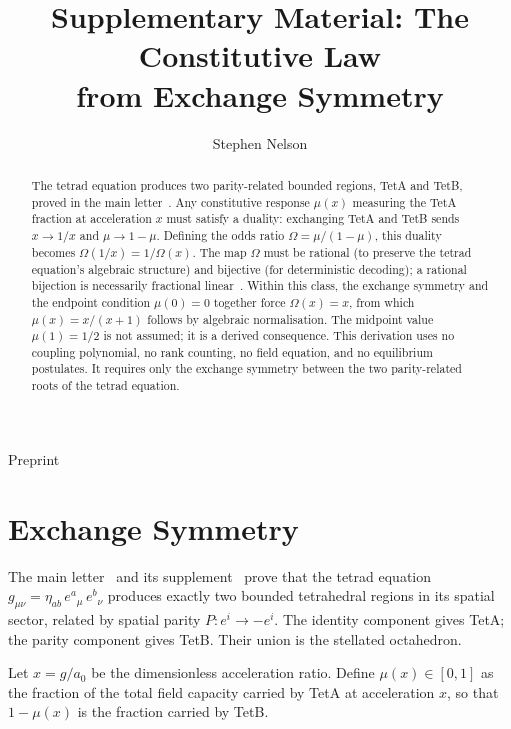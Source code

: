 \documentclass[twocolumn]{iopjournal}
\renewcommand{\articletype}[1]{%
  {\vspace*{-8mm}\noindent \Large \sf Preprint}\par
  \vspace*{6mm}\noindent{\scriptsize \sf{\bfseries \MakeUppercase{#1}}}}
\begin{document}
\articletype{Supplementary Material}

\title{Supplementary Material: The Constitutive Law\\
from Exchange Symmetry}

\author{Stephen Nelson}



\begin{abstract}
The tetrad equation produces two parity-related bounded regions,
TetA and TetB, proved in the main
letter~\cite{Nelson2026geometry}. Any constitutive response
$\mu(x)$ measuring the TetA fraction at acceleration $x$ must
satisfy a duality: exchanging TetA and TetB sends $x \to 1/x$
and $\mu \to 1 - \mu$. Defining the odds ratio
$\Omega = \mu/(1 - \mu)$, this duality becomes
$\Omega(1/x) = 1/\Omega(x)$. The map $\Omega$ must be rational
(to preserve the tetrad equation's algebraic structure) and
bijective (for deterministic decoding); a rational bijection
is necessarily fractional linear~\cite{Hartshorne1977}. Within
this class, the exchange symmetry and the endpoint condition
$\mu(0) = 0$ together force $\Omega(x) = x$, from which
$\mu(x) = x/(x+1)$ follows by algebraic normalisation. The
midpoint value $\mu(1) = 1/2$ is not assumed; it is a derived
consequence. This derivation uses no coupling polynomial, no
rank counting, no field equation, and no equilibrium postulates.
It requires only the exchange symmetry between the two
parity-related roots of the tetrad equation.
\end{abstract}


\section*{Exchange Symmetry}

The main letter~\cite{Nelson2026geometry} and its
supplement~\cite{Nelson2026scheme} prove that the tetrad
equation $g_{\mu\nu} = \eta_{ab}\, e^a{}_\mu\, e^b{}_\nu$
produces exactly two bounded tetrahedral regions in its spatial
sector, related by spatial parity $P: e^i \to -e^i$. The
identity component gives TetA; the parity component gives TetB.
Their union is the stellated octahedron.

Let $x = g/a_0$ be the dimensionless acceleration ratio. Define
$\mu(x) \in [0,1]$ as the fraction of the total field capacity
carried by TetA at acceleration $x$, so that $1 - \mu(x)$ is
the fraction carried by TetB.
\end{document}
